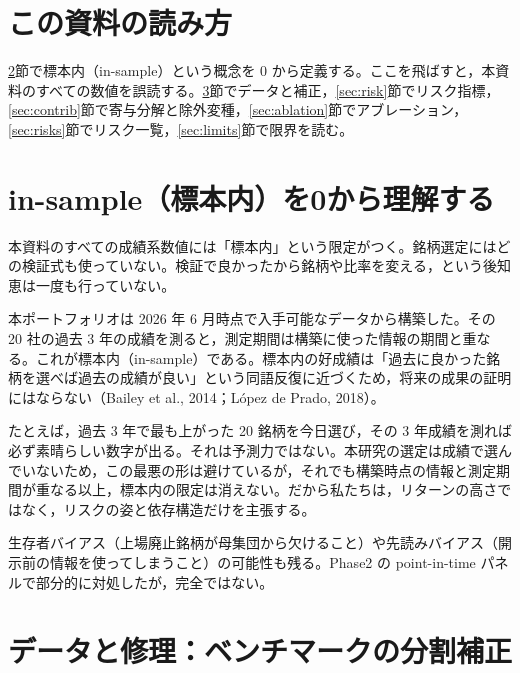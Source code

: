 \documentclass[a4paper,10pt]{article}
\begin{document}
\section{この資料の読み方}

\ref{sec:insample}節で標本内（in-sample）という概念を 0 から定義する。ここを飛ばすと，本資料のすべての数値を誤読する。\ref{sec:data}節でデータと補正，\ref{sec:risk}節でリスク指標，\ref{sec:contrib}節で寄与分解と除外変種，\ref{sec:ablation}節でアブレーション，\ref{sec:risks}節でリスク一覧，\ref{sec:limits}節で限界を読む。

\section{in-sample（標本内）を0から理解する}
\label{sec:insample}

\begin{keybox}[フローでの位置]
本資料のすべての成績系数値には「標本内」という限定がつく。銘柄選定にはどの検証式も使っていない。検証で良かったから銘柄や比率を変える，という後知恵は一度も行っていない。
\end{keybox}

本ポートフォリオは 2026 年 6 月時点で入手可能なデータから構築した。その 20 社の過去 3 年の成績を測ると，測定期間は構築に使った情報の期間と重なる。これが標本内（in-sample）である。標本内の好成績は「過去に良かった銘柄を選べば過去の成績が良い」という同語反復に近づくため，将来の成果の証明にはならない（Bailey et al., 2014；López de Prado, 2018）。

\begin{defbox}
たとえば，過去 3 年で最も上がった 20 銘柄を今日選び，その 3 年成績を測れば必ず素晴らしい数字が出る。それは予測力ではない。本研究の選定は成績で選んでいないため，この最悪の形は避けているが，それでも構築時点の情報と測定期間が重なる以上，標本内の限定は消えない。だから私たちは，リターンの高さではなく，リスクの姿と依存構造だけを主張する。
\end{defbox}

生存者バイアス（上場廃止銘柄が母集団から欠けること）や先読みバイアス（開示前の情報を使ってしまうこと）の可能性も残る。Phase2 の point-in-time パネルで部分的に対処したが，完全ではない。

\section{データと修理：ベンチマークの分割補正}
\label{sec:data}
\end{document}
